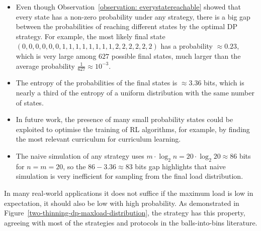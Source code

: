 \begin{itemize}
    \item Even though Observation~\ref{observation: everystatereachable} showed that every state has a non-zero probability under any strategy, there is a big gap between the probabilities of reaching different states by the optimal DP strategy. For example, the most likely final state $(0, 0, 0, 0, 0, 0, 1, 1, 1, 1, 1, 1, 1, 1, 2, 2, 2, 2, 2, 2)$ has a probability $\approx 0.23$, which is very large among $627$ possible final states, much larger than the average probability $\frac{1}{627}\approx 10^{-3}$.
    \item The entropy of the probabilities of the final states is $\approx 3.36$ bits, which is nearly a third of the entropy of a uniform distribution with the same number of states.
    \item In future work, the presence of many small probability states could be exploited to optimise the training of RL algorithms, for example, by finding the most relevant curriculum for curriculum learning.
    \item The naive simulation of any strategy uses $m\cdot \log_2 n=20\cdot \log_2 20\approx 86$ bits for $n=m=20$, so the $86-3.36\approx 83$ bits gap highlights that naive simulation is very inefficient for sampling from the final load distribution.
\end{itemize}


In many real-world applications it does not suffice if the maximum load is low in expectation, it should also be low with high probability. As demonstrated in Figure~\ref{two-thinning-dp-maxload-distribution}, the \DP strategy has this property, agreeing with most of the strategies and protocols in the balls-into-bins literature.

